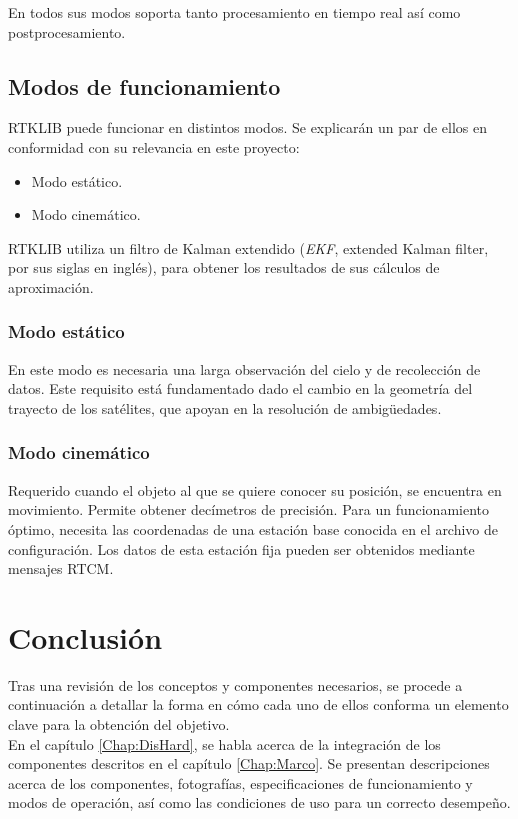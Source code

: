En todos sus modos soporta tanto procesamiento en tiempo real así como postprocesamiento\cite{takasu2009development}.

\subsection{Modos de funcionamiento}

RTKLIB puede funcionar en distintos modos. Se explicarán un par de ellos en conformidad con su relevancia en este proyecto:

\begin{itemize}
\item Modo estático.
\item Modo cinemático.
\end{itemize}

RTKLIB utiliza un filtro de Kalman extendido (\textit{EKF}, extended Kalman filter, por sus siglas en inglés), para obtener los resultados de sus cálculos de aproximación. 

\subsubsection{Modo estático}
En este modo es necesaria una larga observación del cielo y de recolección de datos. Este requisito está fundamentado dado el cambio en la geometría del trayecto de los satélites, que apoyan en la resolución de ambigüedades\cite{wisniewski2013evaluation}.

\subsubsection{Modo cinemático}
Requerido cuando el objeto al que se quiere conocer su posición, se encuentra en movimiento. Permite obtener decímetros de precisión. Para un funcionamiento óptimo, necesita las coordenadas de una estación base conocida en el archivo de configuración. Los datos de esta estación fija pueden ser obtenidos mediante mensajes RTCM\cite{wisniewski2013evaluation}.

\section{Conclusión}

Tras una revisión de los conceptos y componentes necesarios, se procede a continuación a detallar la forma en cómo cada uno de ellos conforma un elemento clave para la obtención del objetivo.\\

En el capítulo \ref{Chap:DisHard}, se habla acerca de la integración de los componentes descritos en el capítulo \ref{Chap:Marco}. Se presentan descripciones acerca de los componentes, fotografías, especificaciones de funcionamiento y modos de operación, así como las condiciones de uso para un correcto desempeño. 